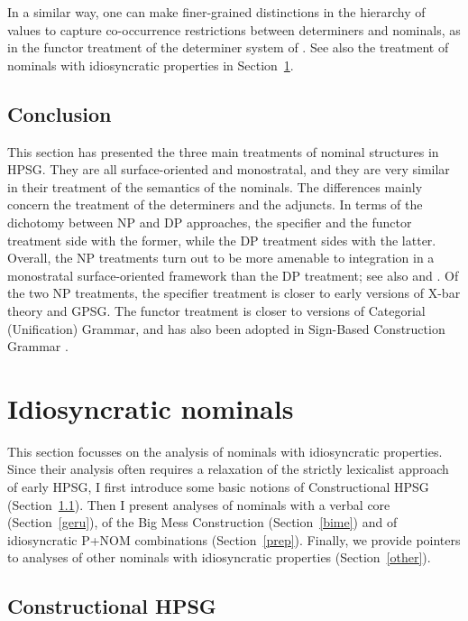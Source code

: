 \documentclass[output=paper
	        ,collection
	        ,collectionchapter
 	        ,biblatex
                ,babelshorthands
                ,newtxmath
                ,draftmode
                ,colorlinks, citecolor=brown
]{langscibook}
\begin{document}
In a similar way, one can make finer-grained distinctions in the hierarchy of  
 values to capture co-occurrence restrictions between determiners and 
nominals, as in the functor treatment of the  determiner system of 
\citet{Allegranza06}. See also the treatment of nominals with idiosyncratic properties 
in Section~\ref{idio}. 


\subsection{Conclusion} 


This section has presented the three main treatments of nominal structures in HPSG. 
They are all surface-oriented and monostratal, and they are very similar in their 
treatment of the semantics of the nominals. 
The differences mainly concern the treatment of the determiners and the adjuncts. 
In terms of the dichotomy between NP and DP approaches, the specifier and the functor 
treatment side with the former, while the DP treatment sides with the latter. 
Overall, the NP treatments turn out to be more amenable to integration  
in a monostratal surface-oriented framework than the DP treatment; see also \citet{MuellerHeadless}
and \citet{VanEynde2020}. Of the two NP treatments,
the specifier treatment is closer to early versions of X-bar theory and GPSG.   
The functor treatment is closer to versions of Categorial (Unification) Grammar, and 
has also been adopted in Sign-Based Construction Grammar \citep[155--157]{Sag2012}.

 

\section{Idiosyncratic nominals}
\label{idio}


This section focusses on the analysis of nominals with idiosyncratic properties. 
Since their analysis often requires a relaxation of the strictly lexicalist approach 
of early HPSG, I first introduce some basic notions of Constructional HPSG (Section~\ref{cohp}). 
Then I present analyses of nominals with a verbal core (Section~\ref{geru}), 
of the Big Mess Construction (Section~\ref{bime}) and of idiosyncratic P+NOM combinations 
(Section~\ref{prep}). Finally, we provide pointers to analyses of other nominals with 
idiosyncratic properties (Section~\ref{other}). 


\subsection{Constructional HPSG} 
\label{cohp}
\end{document}
